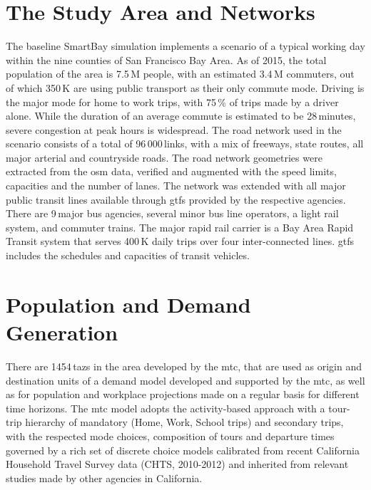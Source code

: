\section{The Study Area and Networks}
The baseline SmartBay simulation implements a scenario of a typical working day within the nine counties of San Francisco Bay Area. As of 2015, the total population of the area is 7.5\,M people, with an estimated 3.4\,M commuters, out of which 350\,K are using public transport as their only commute mode. Driving is the major mode for home to work trips, with 75\,\% of trips made by a driver alone. While the duration of an average commute is estimated to be 28\,minutes, severe congestion at peak hours is widespread. The road network used in the scenario consists of a total of 96\,000\,links, with a mix of freeways, state routes, all major arterial and countryside roads. The road network geometries were extracted from the \gls{osm} data, verified and augmented with the speed limits, capacities and the number of lanes. The network was extended with all major public transit lines available through \gls{gtfs} provided by the respective agencies. There are 9\,major bus agencies, several minor bus line operators, a light rail system, and commuter trains. The major rapid rail carrier is a Bay Area Rapid Transit system that serves 400\,K daily trips over four inter-connected lines. \gls{gtfs} includes the schedules and capacities of transit vehicles.

\section{Population and Demand Generation}
There are 1454\,\glspl{taz} in the area developed by the \gls{mtc}, that are used as origin and destination units of a demand model developed and supported by the \gls{mtc}, as well as for population and workplace projections made on a regular basis for different time horizons. The \gls{mtc} model adopts the activity-based approach with a tour-trip hierarchy of mandatory (Home, Work, School trips) and secondary trips, with the respected mode choices, composition of tours and departure times governed by a rich set of discrete choice models calibrated from recent California Household Travel Survey data (CHTS, 2010-2012) and inherited from relevant studies made by other agencies in California. 

